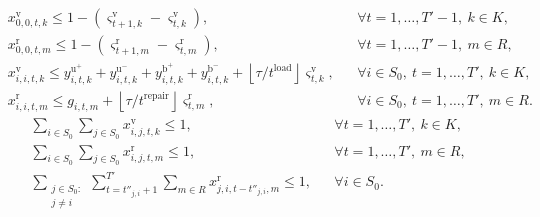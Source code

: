 \endgroup
\begin{subequations}\label{eq:waiting-self-loops}
\begin{align}
&x_{0,0,t,k}^{\mathrm{v}}
\le 1-\left(\varsigma_{t+1,k}^{\mathrm{v}}-\varsigma_{t,k}^{\mathrm{v}}\right),
&&\forall t=1,\ldots,T'-1,\ k\in K, \label{eq:truck-depot-wait}\\
&x_{0,0,t,m}^{\mathrm{r}}
\le 1-\left(\varsigma_{t+1,m}^{\mathrm{r}}-\varsigma_{t,m}^{\mathrm{r}}\right),
&&\forall t=1,\ldots,T'-1,\ m\in R, \label{eq:repairer-depot-wait}\\
&x_{i,i,t,k}^{\mathrm{v}}
\le y_{i,t,k}^{\mathrm{u}^{+}}+y_{i,t,k}^{\mathrm{u}^{-}}
+y_{i,t,k}^{\mathrm{b}^{+}}+y_{i,t,k}^{\mathrm{b}^{-}}
+\left\lfloor \tau/t^{\mathrm{load}}\right\rfloor\varsigma_{t,k}^{\mathrm{v}},
&&\forall i\in S_0,\ t=1,\ldots,T',\ k\in K, \label{eq:truck-self-loop}\\
&x_{i,i,t,m}^{\mathrm{r}}
\le g_{i,t,m}
+\left\lfloor \tau/t^{\mathrm{repair}}\right\rfloor\varsigma_{t,m}^{\mathrm{r}},
&&\forall i\in S_0,\ t=1,\ldots,T',\ m\in R. \label{eq:repairer-self-loop}
\end{align}
\end{subequations}
\begin{subequations}\label{eq:movement-visit-limits}
\begin{align}
&\sum_{i\in S_0}\sum_{j\in S_0}x_{i,j,t,k}^{\mathrm{v}}
\le 1,
&&\forall t=1,\ldots,T',\ k\in K, \label{eq:truck-one-action}\\
&\sum_{i\in S_0}\sum_{j\in S_0}x_{i,j,t,m}^{\mathrm{r}}
\le 1,
&&\forall t=1,\ldots,T',\ m\in R, \label{eq:repairer-one-action}\\
&\sum_{\substack{j\in S_0:\\ j\ne i}}
\sum_{t=t''_{j,i}+1}^{T'}
\sum_{m\in R}x_{j,i,t-t''_{j,i},m}^{\mathrm{r}}
\le 1,
&&\forall i\in S_0. \label{eq:single-repairer-visit}
\end{align}
\end{subequations}

